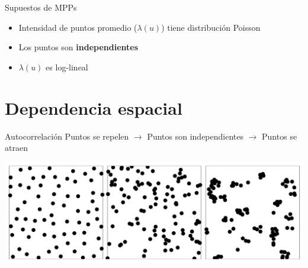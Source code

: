 \documentclass[
  11pt,
  ignorenonframetext,
]{beamer}
\providecommand{\tightlist}{%
  \setlength{\itemsep}{0pt}\setlength{\parskip}{0pt}}
\begin{document}
\begin{frame}{Supuestos de MPPs}
\protect\hypertarget{supuestos-de-mpps}{}
\begin{itemize}
\tightlist
\item
  Intensidad de puntos promedio (\(\lambda(u)\)) tiene distribución
  Poisson
\item
  Los puntos son \textbf{independientes}
\item
  \(\lambda(u)\) es log-lineal
\end{itemize}
\end{frame}

\hypertarget{dependencia-espacial}{%
\section{Dependencia espacial}\label{dependencia-espacial}}

\begin{frame}{Autocorrelación}
\protect\hypertarget{autocorrelaciuxf3n}{}
Puntos se repelen \(\rightarrow\) Puntos son independientes
\(\rightarrow\) Puntos se atraen

\begin{center}\includegraphics{Figuras/Ejemplo-procesos} \end{center}
\end{frame}
\end{document}
